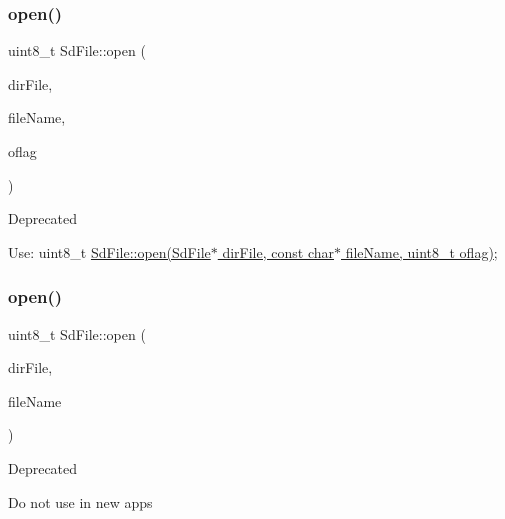 \subsubsection{\texorpdfstring{open()}{open()}\hspace{0.1cm}{\footnotesize\ttfamily [3/5]}}
{\footnotesize\ttfamily uint8\+\_\+t Sd\+File\+::open (\begin{DoxyParamCaption}\item[{\hyperlink{class_sd_file}{Sd\+File} \&}]{dir\+File,  }\item[{const char $\ast$}]{file\+Name,  }\item[{uint8\+\_\+t}]{oflag }\end{DoxyParamCaption})\hspace{0.3cm}{\ttfamily [inline]}}

\begin{DoxyRefDesc}{Deprecated}
\item[\hyperlink{deprecated__deprecated000006}{Deprecated}]Use\+: uint8\+\_\+t \hyperlink{class_sd_file_a3cf2167ad5ba6d84942ede8d2d07dcc6}{Sd\+File\+::open(\+Sd\+File$\ast$ dir\+File, const char$\ast$ file\+Name, uint8\+\_\+t oflag)}; \end{DoxyRefDesc}
\mbox{\label{class_sd_file_a71e1c08dc4fb58b95554925a25435721}} 
\subsubsection{\texorpdfstring{open()}{open()}\hspace{0.1cm}{\footnotesize\ttfamily [4/5]}}
{\footnotesize\ttfamily uint8\+\_\+t Sd\+File\+::open (\begin{DoxyParamCaption}\item[{\hyperlink{class_sd_file}{Sd\+File} \&}]{dir\+File,  }\item[{const char $\ast$}]{file\+Name }\end{DoxyParamCaption})\hspace{0.3cm}{\ttfamily [inline]}}

\begin{DoxyRefDesc}{Deprecated}
\item[\hyperlink{deprecated__deprecated000007}{Deprecated}]Do not use in new apps \end{DoxyRefDesc}
\mbox{\label{class_sd_file_a8bc20433f081a6e9f1546601b7a1d712}} 
